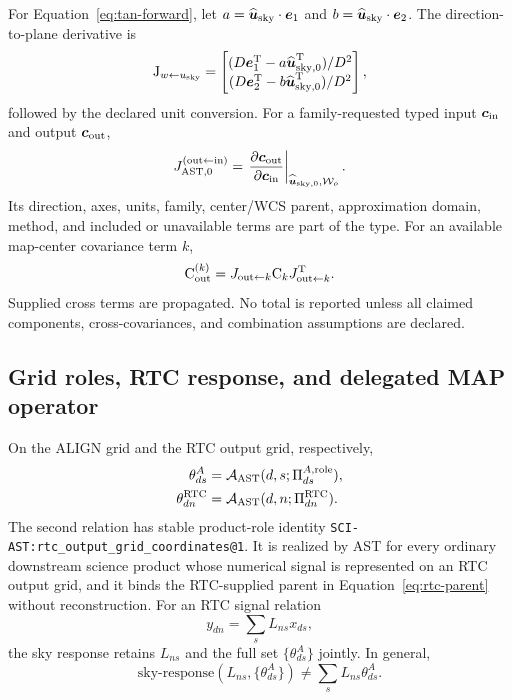 For Equation~\ref{eq:tan-forward}, let
$a=\widehat{\boldsymbol u}_{\rm sky}\cdot\boldsymbol e_1$ and
$b=\widehat{\boldsymbol u}_{\rm sky}\cdot\boldsymbol e_2$.  The
direction-to-plane derivative is
\begin{equation}
 \mathsf J_{w\leftarrow u_{\rm sky}}=
 \begin{bmatrix}
 (D\boldsymbol e_1^\mathsf T-a\widehat{\boldsymbol u}_{\rm sky,0}^\mathsf T)/D^2\\
 (D\boldsymbol e_2^\mathsf T-b\widehat{\boldsymbol u}_{\rm sky,0}^\mathsf T)/D^2
 \end{bmatrix},
 \label{eq:projection-jacobian}
\end{equation}
followed by the declared unit conversion.  For a family-requested typed input
$\boldsymbol c_{\rm in}$ and output $\boldsymbol c_{\rm out}$,
\begin{equation}
 J_{\rm AST,0}^{({\rm out}\leftarrow{\rm in})}
 =\left.\frac{\partial\boldsymbol c_{\rm out}}
                {\partial\boldsymbol c_{\rm in}}\right|_{\widehat{\boldsymbol u}_{\rm sky,0},
                \mathcal W_o}.
 \label{eq:map-center-jacobian}
\end{equation}
Its direction, axes, units, family, center/WCS parent, approximation domain,
method, and included or unavailable terms are part of the type.  For an available
map-center covariance term $k$,
\begin{equation}
 \mathsf C_{\rm out}^{(k)}=
 J_{{\rm out}\leftarrow k}\mathsf C_k
 J_{{\rm out}\leftarrow k}^{\mathsf T}.
 \label{eq:center-covariance}
\end{equation}
Supplied cross terms are propagated.  No total is reported unless all claimed
components, cross-covariances, and combination assumptions are declared.

\subsection{Grid roles, RTC response, and delegated MAP operator}

On the ALIGN grid and the RTC output grid, respectively,
\begin{align}
 \theta^A_{ds}
   &=\mathcal A_{\rm AST}(d,s;\Pi^{A,{\rm role}}_{ds}),
   \label{eq:theta-align}\\
 \theta^{\rm RTC}_{dn}
   &=\mathcal A_{\rm AST}(d,n;\Pi^{\rm RTC}_{dn}).
   \label{eq:theta-rtc}
\end{align}
The second relation has stable product-role identity
\texttt{SCI-AST:rtc\_output\_grid\_coordinates@1}.  It is realized by AST for
every ordinary downstream science product whose numerical signal is
represented on an RTC output grid, and it binds the RTC-supplied parent in
Equation~\ref{eq:rtc-parent} without reconstruction.
For an RTC signal relation
\begin{equation}
 y_{dn}=\sum_s L_{ns}x_{ds},
 \label{eq:rtc-signal}
\end{equation}
the sky response retains $L_{ns}$ and the full set
$\{\theta^A_{ds}\}$ jointly.  In general,
\begin{equation}
 \text{sky-response}(L_{ns},\{\theta^A_{ds}\})
 \neq \sum_s L_{ns}\theta^A_{ds}.
 \label{eq:not-angular-filter}
\end{equation}

